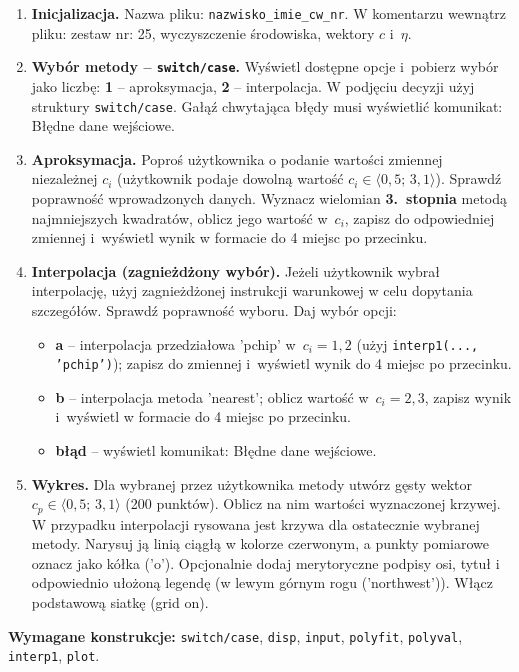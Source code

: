 \documentclass[a4paper,11pt]{article}
\begin{document}
\begin{enumerate}[leftmargin=*, label=\textbf{\arabic*.}, itemsep=2pt]

  \item \textbf{Inicjalizacja.}
    Nazwa pliku: \texttt{nazwisko\_imie\_cw\_nr}. W komentarzu wewnątrz pliku: zestaw nr: 25, wyczyszczenie środowiska, wektory $c$ i~$\eta$.

  \item \textbf{Wybór metody -- \texttt{switch/case}.}
    Wyświetl dostępne opcje i~pobierz wybór jako liczbę: \textbf{1} -- aproksymacja, \textbf{2} -- interpolacja. W podjęciu decyzji użyj struktury \texttt{switch/case}. Gałąź chwytająca błędy musi wyświetlić komunikat: Błędne dane wejściowe.

  \item \textbf{Aproksymacja.}
    Poproś użytkownika o podanie wartości zmiennej niezależnej $c_i$ (użytkownik podaje dowolną wartość $c_i \in \langle 0{,}5;\,3{,}1 \rangle$). Sprawdź poprawność wprowadzonych danych. Wyznacz wielomian \textbf{3.~stopnia} metodą najmniejszych kwadratów, oblicz jego wartość w~$c_i$, zapisz do odpowiedniej zmiennej i~wyświetl wynik w formacie do 4 miejsc po przecinku.

  \item \textbf{Interpolacja (zagnieżdżony wybór).}
    Jeżeli użytkownik wybrał interpolację, użyj zagnieżdżonej instrukcji warunkowej w celu dopytania szczegółów. Sprawdź poprawność wyboru. Daj wybór opcji:
    \begin{itemize}[itemsep=1pt]
      \item \textbf{a} -- interpolacja przedziałowa 'pchip' w~$c_i = 1{,}2$ (użyj \texttt{interp1(..., 'pchip')}); zapisz do zmiennej i~wyświetl wynik do 4 miejsc po przecinku.
      \item \textbf{b} -- interpolacja metoda 'nearest'; oblicz wartość w~$c_i = 2{,}3$, zapisz wynik i~wyświetl w formacie do 4 miejsc po przecinku.
      \item \textbf{błąd} -- wyświetl komunikat: Błędne dane wejściowe.
    \end{itemize}

  \item \textbf{Wykres.}
    Dla wybranej przez użytkownika metody utwórz gęsty wektor $c_p \in \langle 0{,}5;\,3{,}1 \rangle$ (200 punktów). Oblicz na nim wartości wyznaczonej krzywej. W przypadku interpolacji rysowana jest krzywa dla ostatecznie wybranej metody. Narysuj ją linią ciągłą w kolorze czerwonym, a punkty pomiarowe oznacz jako kółka ('o'). Opcjonalnie dodaj merytoryczne podpisy osi, tytuł i odpowiednio ułożoną legendę (w lewym górnym rogu ('northwest')). Włącz podstawową siatkę (grid on).

\end{enumerate}

\vspace{0.3cm}
\begin{ramka}
\textbf{Wymagane konstrukcje:}
\texttt{switch/case}, \texttt{disp}, \texttt{input}, \texttt{polyfit}, \texttt{polyval}, \texttt{interp1}, \texttt{plot}.
\end{ramka}
\end{document}
